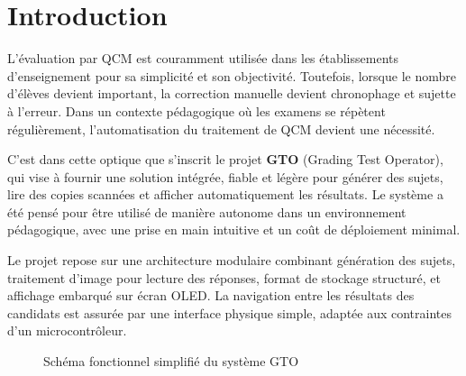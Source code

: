 \documentclass[a4paper,11pt]{article}
\begin{document}
\tableofcontents
\newpage

\section{Introduction}

L’évaluation par QCM est couramment utilisée dans les établissements d’enseignement pour sa simplicité et son objectivité. Toutefois, lorsque le nombre d’élèves devient important, la correction manuelle devient chronophage et sujette à l’erreur. Dans un contexte pédagogique où les examens se répètent régulièrement, l’automatisation du traitement de QCM devient une nécessité.

\vspace*{0.5 cm}

C’est dans cette optique que s’inscrit le projet \textbf{GTO} (Grading Test Operator), qui vise à fournir une solution intégrée, fiable et légère pour générer des sujets, lire des copies scannées et afficher automatiquement les résultats. Le système a été pensé pour être utilisé de manière autonome dans un environnement pédagogique, avec une prise en main intuitive et un coût de déploiement minimal.

\vspace*{0.5 cm}

Le projet repose sur une architecture modulaire combinant génération des sujets, traitement d’image pour lecture des réponses, format de stockage structuré, et affichage embarqué sur écran OLED. La navigation entre les résultats des candidats est assurée par une interface physique simple, adaptée aux contraintes d’un microcontrôleur.

\vspace*{1 cm}

\begin{figure}[h!]
    \centering
    \begin{adjustbox}{max width=\textwidth}
    \end{adjustbox}
    \caption{Schéma fonctionnel simplifié du système GTO}
    \label{fig:schema-fonctionnel-gto}
\end{figure}
\end{document}
